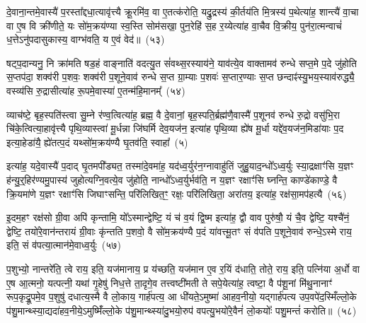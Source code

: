 दे॒वाना॒न्तमे॒वास्यै॑ प॒रस्ता᳚द्दधा॒त्यावृ॑त्त्यै क्रू॒रमि॑व॒ वा ए॒तत्क॑रोति॒ यद्रु॒द्रस्य॑ की॒र्तय॑ति मि॒त्रस्य॑ प॒थेत्या॑ह॒ शान्त्यै॑ वा॒चा वा ए॒ष वि क्री॑णीते॒ यः सो॑म॒क्रय॑ण्या स्व॒स्ति सोम॑सखा॒ पुन॒रेहि॑ स॒ह र॒य्येत्या॑ह वा॒चैव वि॒क्रीय॒ पुन॑रा॒त्मन्वाचं॑ ध॒त्ते\-ऽनु॑पदासुकास्य॒ वाग्भ॑वति॒ य ए॒वं वेद॑॥~(५३)

{\anuvakamend[{सत॑नुं॒ विष्ण॑व॒ इत्या॑ह स॒मारो॑हति॒ ध्याय॑ति॒ तद्वा॒चा यज॑मानः स्यात्करोति क्रू॒रो वेद॑}]}%

षट्प॒दान्यनु॒ नि क्रा॑मति षड॒हं वाङ्नाति॑ वदत्यु॒त सं॑वथ्स॒रस्याय॑ने॒ याव॑त्ये॒व वाक्तामव॑ रुन्धे सप्त॒मे प॒दे जु॑होति स॒प्तप॑दा॒ शक्व॑री प॒शवः॒ शक्व॑री प॒शूने॒वाव॑ रुन्धे स॒प्त ग्रा॒म्याः प॒शवः॑ स॒प्तार॒ण्याः स॒प्त छन्दाꣴ॑स्यु॒भय॒स्याव॑रुद्ध्यै॒ वस्व्य॑सि रु॒द्रासीत्या॑ह रू॒पमे॒वास्या॑ ए॒तन्म॑हि॒मानम्᳚~(५४)

व्याच॑ष्टे॒ बृह॒स्पति॑स्त्वा सु॒म्ने र॑ण्व॒त्वित्या॑ह॒ ब्रह्म॒ वै दे॒वानां॒ बृह॒स्पति॒र्ब्रह्म॑णै॒वास्मै॑ प॒शूनव॑ रुन्धे रु॒द्रो वसु॑भि॒रा चि॑के॒त्वित्या॒हावृ॑त्त्यै पृथि॒व्यास्त्वा॑ मू॒र्धन्ना जि॑घर्मि देव॒यज॑न॒ इत्या॑ह पृथि॒व्या ह्ये॑ष मू॒र्धा यद्दे॑व॒यज॑न॒मिडा॑याः प॒द इत्या॒हेडा॑यै॒ ह्ये॑तत्प॒दं यथ्सो॑म॒क्रय॑ण्यै घृ॒तव॑ति॒ स्वाहा᳚~(५)

इत्या॑ह॒ यदे॒वास्यै॑ प॒दाद् घृ॒तमपी᳚ड्यत॒ तस्मा॑दे॒वमा॑ह॒ यद॑ध्व॒र्युर॑न॒ग्नावाहु॑तिं जुहु॒याद॒न्धो᳚\-ऽध्व॒र्युः स्या॒द्रक्षाꣳ॑सि य॒ज्ञꣳ ह॑न्यु॒र्॒\mbox{}हिर॑ण्यमु॒पास्य॑ जुहोत्यग्नि॒वत्ये॒व जु॑होति॒ नान्धो᳚\-ऽध्व॒र्युर्भव॑ति॒ न य॒ज्ञꣳ रक्षाꣳ॑सि घ्नन्ति॒ काण्डे॑काण्डे॒ वै क्रि॒यमा॑णे य॒ज्ञꣳ रक्षाꣳ॑सि जिघाꣳसन्ति॒ परि॑लिखित॒ꣳ॒ रक्षः॒ परि॑लिखिता॒ अरा॑तय॒ इत्या॑ह॒ रक्ष॑सा॒मप॑हत्यै~(५६)

इ॒दम॒हꣳ रक्ष॑सो ग्री॒वा अपि॑ कृन्तामि॒ यो᳚\-ऽस्मान्द्वेष्टि॒ यं च॑ व॒यं द्वि॒ष्म इत्या॑ह॒ द्वौ वाव पुरु॑षौ॒ यं चै॒व द्वेष्टि॒ यश्चै॑नं॒ द्वेष्टि॒ तयो॑रे॒वान॑न्तरायं ग्री॒वाः कृ॑न्तति प॒शवो॒ वै सो॑म॒क्रय॑ण्यै प॒दं या॑वत्त्मू॒तꣳ सं व॑पति प॒शूने॒वाव॑ रुन्धे॒\-ऽस्मे राय॒ इति॒ सं व॑पत्या॒त्मान॑मे॒वाध्व॒र्युः~(५७)

प॒शुभ्यो॒ नान्तरे॑ति॒ त्वे राय॒ इति॒ यज॑मानाय॒ प्र य॑च्छति॒ यज॑मान ए॒व र॒यिं द॑धाति॒ तोते॒ राय॒ इति॒ पत्नि॑या अ॒र्धो वा ए॒ष आ॒त्मनो॒ यत्पत्नी॒ यथा॑ गृ॒हेषु॑ निध॒त्ते ता॒दृगे॒व तत्त्वष्टी॑मती ते सपे॒येत्या॑ह॒ त्वष्टा॒ वै प॑शू॒नां मि॑थु॒नानाꣳ॑ रूप॒कृद्रू॒पमे॒व प॒शुषु॑ दधात्य॒स्मै वै लो॒काय॒ गार्\mbox{}ह॑पत्य॒ आ धी॑यते॒\-ऽमुष्मा॑ आहव॒नीयो॒ यद्गार्\mbox{}ह॑पत्य उप॒वपे॑द॒स्मिँल्लो॒के प॑शु॒मान्थ्स्या॒द्यदा॑हव॒नीये॒\-ऽमुष्मिँ॑ल्लो॒के प॑शु॒मान्थ्स्या॑दु॒भयो॒रुप॑ वपत्यु॒भयो॑रे॒वैनं॑ लो॒कयोः᳚ पशु॒मन्तं॑ करोति॥~(५८)

